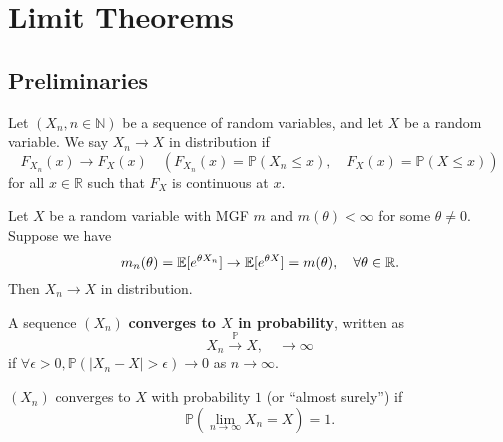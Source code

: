 \section{Limit Theorems}
\subsection{Preliminaries}
\begin{definition}
    Let $(X_n,n\in\mathbb N)$ be a sequence of random variables, and let $X$ be a random variable. We say $X_n\to X$ in distribution if
    $$F_{X_n}(x)\to F_X(x)\quad (F_{X_n}(x)=\mathbb P(X_n\le x),\quad F_X(x)=\mathbb P(X\le x))$$
    for all $x\in\mathbb R$ such that $F_X$ is continuous at $x$.
\end{definition}

\begin{theorem}
    Let $X$ be a random variable with MGF $m$ and $m(\theta)<\infty$ for some $\theta\neq 0$.
    Suppose we have
    $$m_n(\theta)=\mathbb E[e^{\theta X_n}]\to {\mathbb{E}}[e^{\theta X}] = m(\theta),\quad\forall\theta\in\mathbb R.$$
    Then $X_n\to X$ in distribution.
\end{theorem}

\begin{definition}
    A sequence $(X_n)$ \textbf{converges to $X$ in probability}, written as
    $$X_n\xrightarrow{\mathbb P}X,\quad \to\infty$$
    if $\forall\epsilon>0,\mathbb P(|X_n-X|>\epsilon)\to 0$ as $n\to\infty$.
\end{definition}

\begin{definition}
    $(X_n)$ converges to $X$ with probability $1$ (or ``almost surely'') if
    $$\mathbb P\left(\lim_{n\to\infty}X_n=X\right)=1.$$
\end{definition}

